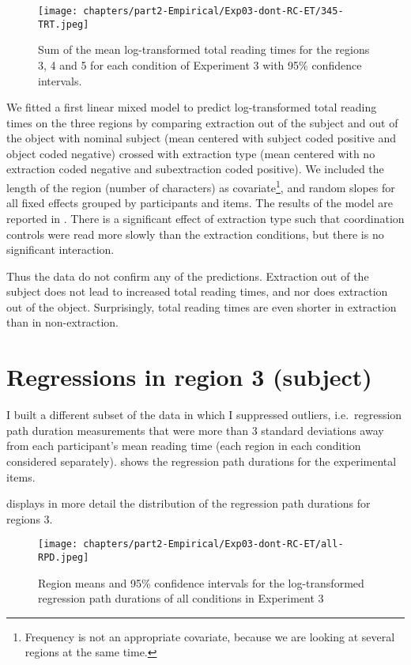 \begin{figure}
    \centering
    \texttt{[image: chapters/part2-Empirical/Exp03-dont-RC-ET/345-TRT.jpeg]}
    \caption{Sum of the mean log-transformed total reading times for the regions 3, 4 and 5 for each condition of Experiment 3 with 95\% confidence intervals.}
    \label{fig:exp03-345-TRT}
\end{figure}

We fitted a first linear mixed model to predict log-transformed total reading times on the three regions by comparing extraction out of the subject and out of the object with nominal subject (mean centered with subject coded positive and object coded negative) crossed with extraction type (mean centered with no extraction coded negative and subextraction coded positive). We included the length of the region (number of characters) as covariate\footnote{Frequency is not an appropriate covariate, because we are looking at several regions at the same time.}, and random slopes for all fixed effects grouped by participants and items. 
The results of the model are reported in . There is a significant effect of extraction type such that coordination controls were read more slowly than the extraction conditions, but there is no significant interaction. 

Thus the data do not confirm any of the predictions. Extraction out of the subject does not lead to increased total reading times, and nor does extraction out of the object. Surprisingly, total reading times are even shorter in extraction than in non-extraction. 



\section{Regressions in region 3 (subject)}

I built a different subset of the data in which I suppressed outliers, i.e.\ regression path duration measurements that were more than 3 standard deviations away from each participant's mean reading time (each region in each condition considered separately). 
 shows the regression path durations for the experimental items.

 displays in more detail the distribution of the regression path durations for regions 3. 

\begin{figure}
    \centering
    \texttt{[image: chapters/part2-Empirical/Exp03-dont-RC-ET/all-RPD.jpeg]}
    \caption{Region means and 95\% confidence intervals for the log-transformed regression path durations of all conditions in Experiment 3}
    \label{fig:exp03-all-RPD}
\end{figure}

